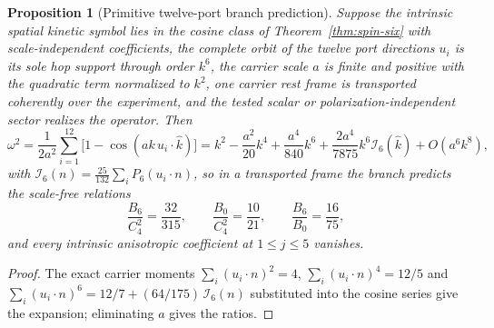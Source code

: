 \documentclass[11pt]{article}
\newtheorem{proposition}[theorem]{Proposition}
\theoremstyle{definition}
\theoremstyle{remark}
\begin{document}
\begin{proposition}[Primitive twelve-port branch prediction]
\label{prop:spin-six-prediction}
Suppose the intrinsic spatial kinetic symbol lies in the cosine class of
Theorem~\ref{thm:spin-six} with scale-independent coefficients, the complete
orbit of the twelve port directions $u_i$ is its sole hop support through
order $k^6$, the carrier scale $a$ is finite and positive with the quadratic
term normalized to $k^2$, one carrier rest frame is transported coherently
over the experiment, and the tested scalar or polarization-independent sector
realizes the operator. Then
\begin{equation}
\omega^2
=\frac{1}{2a^2}\sum_{i=1}^{12}
 \bigl[1-\cos(ak\,u_i\!\cdot\!\widehat k)\bigr]
=k^2-\frac{a^2}{20}k^4+\frac{a^4}{840}k^6
 +\frac{2a^4}{7875}k^6\mathcal I_6(\widehat k)
 +O(a^6k^8),
\label{eq:primitive-port-expansion}
\end{equation}
with $\mathcal I_6(n)=\tfrac{25}{132}\sum_iP_6(u_i\!\cdot\!n)$, so in a
transported frame the branch predicts the scale-free relations
\begin{equation}
\frac{B_6}{C_4^2}=\frac{32}{315},\qquad
\frac{B_0}{C_4^2}=\frac{10}{21},\qquad
\frac{B_6}{B_0}=\frac{16}{75},
\label{eq:primitive-port-ratios}
\end{equation}
and every intrinsic anisotropic coefficient at $1\le j\le5$ vanishes.
\end{proposition}

\begin{proof}
The exact carrier moments $\sum_i(u_i\!\cdot\!n)^2=4$,
$\sum_i(u_i\!\cdot\!n)^4=12/5$ and
$\sum_i(u_i\!\cdot\!n)^6=12/7+(64/175)\,\mathcal I_6(n)$ substituted into the
cosine series give the expansion; eliminating $a$ gives the ratios.
\end{proof}
\end{document}
